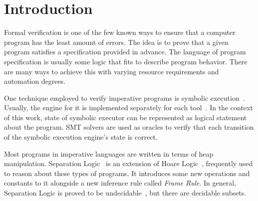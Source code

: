 \documentclass[sigplan,screen,review]{acmart}
\begin{document}



\maketitle


\newcommand{\EM}[1]{\ensuremath{#1}}
\newcommand{\ssymbol}[1]{\EM{#1}}
\newcommand{\bnfdef}{\EM{\vcentcolon\vcentcolon=}}
\newcommand{\emphbf}[1]{\textbf{\emph{#1}}}
\newcommand{\spmid}{\EM{\ \mid \ }}
\newcommand{\vsample}[1]{\EM{\mathit{sample}(#1)}}
\newcommand{\vconst}{\EM{\mathsf{c}}}
\newcommand{\anyval}{\ssymbol{v}}
\newcommand{\anydist}{\ssymbol{d}}
\newcommand{\dnormal}[2]{\EM{\mathit{Normal}(#1,#2)}}
\newcommand{\duniform}[2]{\EM{\mathit{Uniform}(#1,#2)}}

\lstset{mathescape}

\section{Introduction} 

Formal verification is one of the few known ways to ensure that a computer program has the least amount of errors. The idea is to prove that a given program satisfies a specification provided in advance. The language of program specification is usually some logic that fits to describe program behavior. There are many ways to achieve this with varying resource requirements and automation degrees.

One technique employed to verify imperative programs is symbolic execution~\cite{berdine2005symbolic}. Usually, the engine for it is implemented separately for each tool~\cite{DBLP:conf/fmco/BerdineCO05,DBLP:conf/oopsla/DistefanoP08}. In the context of this work, state of symbolic executor can be represented as logical statement about the program. SMT solvers are used as oracles to verify that each transition of the symbolic execution engine's state is correct. 

Most programs in imperative languages are written in terms of heap manipulation. Separation Logic~\cite{DBLP:journals/cacm/OHearn19} is an extension of Hoare Logic~\cite{DBLP:journals/cacm/Hoare69}, frequently used to reason about these types of programs. It introduces some new operations and constants to it alongside a new inference rule called \emph{Frame Rule}. In general, Separation Logic is proved to be undecidable~\cite{DBLP:conf/lics/BrotherstonK10}, but there are decidable subsets.
\end{document}

